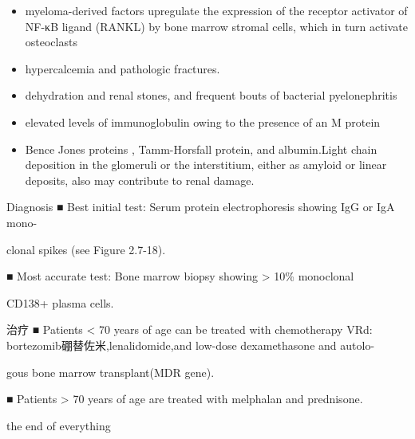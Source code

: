 \documentclass[
  ignorenonframetext,
]{beamer}
\begin{document}
\begin{frame}
\begin{itemize}
\item
  myeloma-derived factors upregulate the expression of the receptor
  activator of NF-κB ligand (RANKL) by bone marrow stromal cells, which
  in turn activate osteoclasts
\item
  hypercalcemia and pathologic fractures.
\item
  dehydration and renal stones, and frequent bouts of bacterial
  pyelonephritis
\item
  elevated levels of immunoglobulin owing to the presence of an M
  protein
\item
  Bence Jones proteins , Tamm-Horsfall protein, and albumin.Light chain
  deposition in the glomeruli or the interstitium, either as amyloid or
  linear deposits, also may contribute to renal damage.
\end{itemize}
\end{frame}

\begin{frame}
\begin{block}{Diagnosis}
\protect\hypertarget{diagnosis-4}{}
■ Best initial test: Serum protein electrophoresis showing IgG or IgA
mono-

clonal spikes (see Figure 2.7-18).

■ Most accurate test: Bone marrow biopsy showing \textgreater{} 10\%
monoclonal

CD138+ plasma cells.
\end{block}
\end{frame}

\begin{frame}
\begin{block}{治疗}
\protect\hypertarget{ux6cbbux7597-12}{}
■ Patients \textless{} 70 years of age can be treated with chemotherapy
VRd: bortezomib硼替佐米,lenalidomide,and low-dose dexamethasone and
autolo-

gous bone marrow transplant(MDR gene).

■ Patients \textgreater{} 70 years of age are treated with melphalan and
prednisone.
\end{block}
\end{frame}

\begin{frame}
the end of everything
\end{frame}
\end{document}
